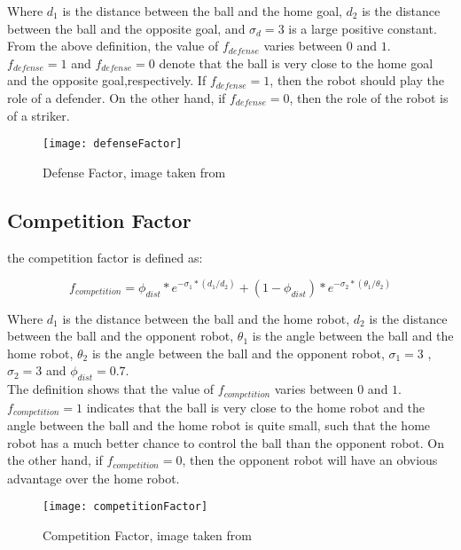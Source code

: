 \documentclass[
10pt, %
a4paper, %
oneside, %
headinclude,footinclude, %
BCOR5mm, %
]{scrartcl}
\begin{document}
Where $d_1$ is the distance between the ball and the home goal, $d_2$ is the distance between the ball and the opposite goal, and $\sigma_d = 3$ is a large positive constant.\\

From the above definition, the value of $f_{defense}$ varies between $0$ and $1$. $f_{defense} = 1$ and
$f_{defense} = 0$ denote that the ball is very close to the home goal and the opposite goal,respectively. If $f_{defense} = 1$, then the robot should play the role of a defender. On the other hand, if $f_{defense} = 0$, then the role of the robot is of a striker.

\begin{figure}
	\centering
	\texttt{[image: defenseFactor]}
	\caption{Defense Factor, image taken from \cite{wu2004fuzzy}}
	\label{fig:fig}
\end{figure}

\subsection{Competition Factor}
 the competition factor is defined as:
 
 \begin{equation}
 	f_{competition} = \phi_{dist}*e^{-\sigma_1*(d_1/d_2)} + (1 - \phi_{dist})*e^{-\sigma_2*(\theta_1/\theta_2)}
 \end{equation}

Where $d_{1}$ is the distance between the ball and the home robot, $d_{2}$ is the distance between the ball and the opponent robot, $\theta_{1}$ is the angle between the ball and the
home robot, $\theta_2$ is the angle between the ball and the opponent robot, $\sigma_1 = 3$ ,$\sigma_2 = 3$ and $\phi_{dist} = 0.7$.\\

The definition shows that the value of $f_{competition}$ varies between $0$ and $1$. $f_{competition} = 1$ indicates that the ball is very close to the home robot and the angle between the ball and the home robot is quite small, such that the home robot has a much better chance to control the ball than the opponent robot. On the other hand, if $f_{competition} = 0$, then the opponent robot will have an obvious advantage over the home robot.

\begin{figure}
	\centering
	\texttt{[image: competitionFactor]}
	\caption{Competition Factor, image taken from \cite{wu2004fuzzy}}
	\label{fig:fig}
\end{figure}
\end{document}
